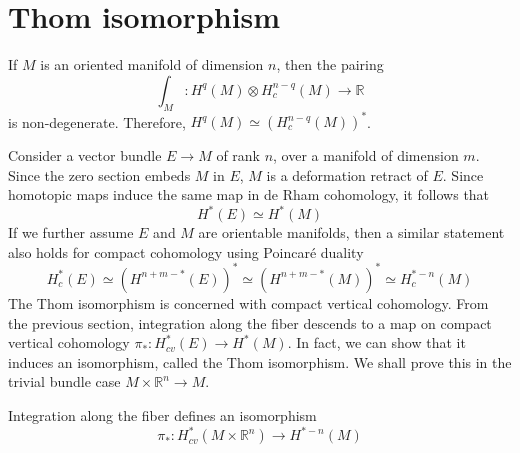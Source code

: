 \section{Thom isomorphism}
\begin{thm} 
	\label{thm:poincare_duality}
	If $M$ is an oriented manifold of dimension $n$, then the pairing 
	\[
	\int_M : H^q(M)\otimes H_c^{n-q}(M) \to \mathbb{R}
	\] 
	is non-degenerate. Therefore, $H^q(M)\simeq (H^{n-q}_c(M))^*$. 
\end{thm}

Consider a vector bundle $E\to M$ of rank  $n$, over a manifold of dimension $m$. 
Since the zero section embeds
$M$ in  $E$, $M$ is a deformation retract of  $E$. Since
homotopic maps induce the same map in de Rham cohomology, it follows that
\[
H^*(E) \simeq H^*(M)
\] 
If we further assume $E$ and  $M$ are orientable manifolds, 
then a similar statement also holds for compact cohomology using 
Poincar\'e duality %
\[
H^*_c(E) \simeq (H^{n+m-*}(E))^* \simeq (H^{n+m-*}(M))^* \simeq H^{*-n}_c(M)
\] 
The Thom isomorphism is concerned with compact vertical cohomology. 
From the previous section, integration along the fiber descends to a map 
on compact vertical cohomology
$\pi_* : H_{cv}^*(E) \to H^*(M)$. In fact, we can show that it induces an
isomorphism, called the Thom isomorphism.
We shall prove this in the trivial bundle case $M\times \mathbb{R}^n \to M$.
\begin{prop} %
	Integration along the fiber defines an isomorphism
	\[
	\pi_* : H_{cv}^*(M\times \mathbb{R}^n) \to H^{*-n}(M)
	\] 
\end{prop}
